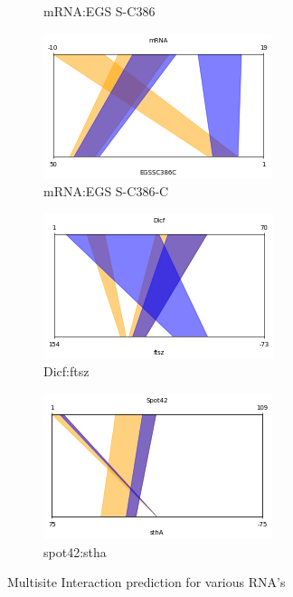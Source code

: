 \documentclass[twoside,a4paper]{report}
\begin{document}
\begin{figure}
\begin{subfigure}{.5\textwidth}
			\caption{mRNA:EGS S-C386}
			\label{fig:egs(e)}
		\end{subfigure}%
		\begin{subfigure}{.5\textwidth}
			\centering
			\includegraphics[width=.9\linewidth]{egs(f)}
			\caption{mRNA:EGS S-C386-C}
			\label{fig:egs(f)}
		\end{subfigure}
		\begin{subfigure}{.5\textwidth}
			\centering
			\includegraphics[width=.9\linewidth]{dic}
			\caption{Dicf:ftsz}
			\label{fig:dic}
		\end{subfigure}%
	\begin{subfigure}{.5\textwidth}
		\centering
		\includegraphics[width=.9\linewidth]{spot}
		\caption{spot42:stha}
		\label{fig:spot4}
	\end{subfigure}
		\caption{Multisite Interaction prediction for various RNA's}
		\label{fig:test}
			
	\end{figure}
\end{document}
